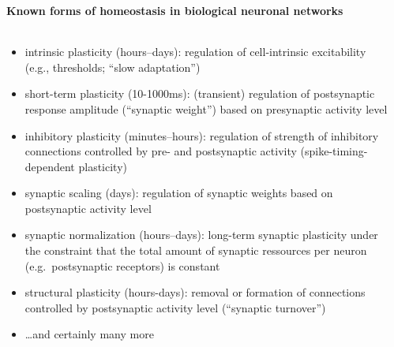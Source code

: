 \documentclass[8pt,t,usepdftitle=false]{beamer}
\begin{document}
\begin{frame}[t,plain]
  \frametitle{\ttl}
  \framesubtitle{Known forms of homeostasis in biological neuronal networks}
  \begin{columns}
    \begin{column}{0.7\linewidth}
      \vspace*{-2ex}
      \begin{itemize}\itemsep1.5ex
      \item<1-> intrinsic plasticity \alert{(hours--days)}:
        regulation of cell-intrinsic excitability (e.g., thresholds; ``slow adaptation'') {\tiny \parencite{Naude12_e1002349}}
      \item<2-> short-term plasticity \alert{(10-1000ms)}:
        (transient) regulation of postsynaptic response amplitude (``synaptic weight'') based on presynaptic activity level
        {\tiny\parencite{Tsodyks97}}
      \item<3-> inhibitory plasticity \alert{(minutes--hours)}:
        regulation of strength of inhibitory connections controlled by pre- and postsynaptic activity (spike-timing-dependent plasticity)\\
        {\tiny \parencite{Hennequin17_557}}
      \item<4-> synaptic scaling \alert{(days)}:
        regulation of synaptic weights based on postsynaptic activity level\\
        {\tiny\parencite{Abbott00_1178,Tetzlaff11_47}}
      \item<5-> synaptic normalization \alert{(hours--days)}:
        long-term synaptic plasticity under the constraint that the total amount of synaptic ressources per neuron (e.g.~postsynaptic receptors) is constant
        {\tiny\parencite{Hartmann15_e1004640}}
      \item<6-> structural plasticity \alert{(hours-days)}:
        removal or formation of connections controlled by postsynaptic activity level (``synaptic turnover'')
        {\tiny \parencite{Butz13_e1003259,Gallinaro18_3,Gallinaro22_e1009836}}
      \item<7-> \ldots and certainly many more
      \end{itemize}      
    \end{column}
    \begin{column}{0.3\linewidth}
      \vspace*{-0.5cm}
\end{column}
\end{columns}
\end{frame}
\end{document}
